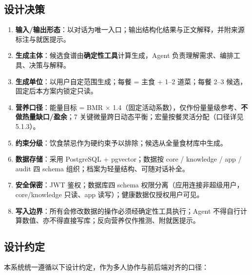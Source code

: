 \documentclass[12pt,a4paper]{ctexart}
\begin{document}
\subsection{设计决策}

\begin{enumerate}
\item \textbf{输入/输出形态}：以对话为唯一入口；输出结构化结果与正文解释，并附来源标注与就医提示。
\item \textbf{生成主体}：候选食谱由\textbf{确定性工具}计算生成，Agent 负责理解需求、编排工具、决策与解释。
\item \textbf{生成单位}：以用户自定范围生成；每餐 = 主食 + 1--2 道菜；每餐 2--3 候选，固定后本方案内锁定只读。
\item \textbf{营养口径}：能量目标 = BMR $\times$ 1.4（固定活动系数），仅作份量量级参考、\textbf{不做热量缺口/盈余}；7 关键微量跨日动态平衡；宏量按餐灵活分配（口径详见 5.1.3）。
\item \textbf{约束分级}：饮食禁忌作为硬约束予以排除；候选从全量食材库中生成。
\item \textbf{数据存储}：采用 PostgreSQL + pgvector；数据按 core / knowledge / app / audit 四 schema 组织；档案为轻量结构、可随对话补全。
\item \textbf{安全保密}：JWT 鉴权；数据库四 schema 权限分离（应用连接非超级用户，core/knowledge 只读、app 读写）；健康数据仅授权用户可见。
\item \textbf{写入边界}：所有会修改数据的操作必须经确定性工具执行；Agent 不得自行计算数值、亦不得直接写库；反向营养仅作推测、附就医提示。
\end{enumerate}

\subsection{设计约定}

本系统统一遵循以下设计约定，作为多人协作与前后端对齐的口径：
\end{document}
